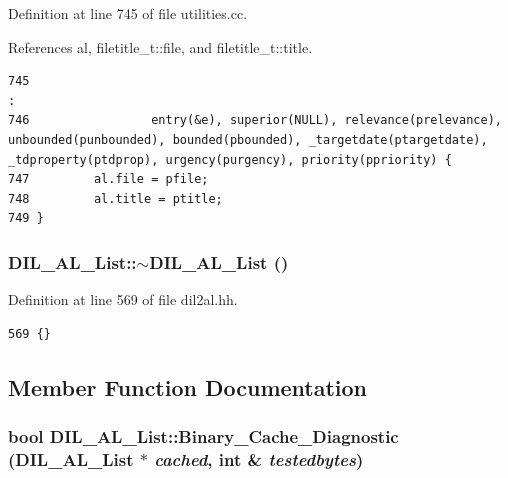 Definition at line 745 of file utilities.cc.

References al, filetitle\_\-t::file, and filetitle\_\-t::title.



\footnotesize\begin{verbatim}745                                                                                                                                                                                         :
746                 entry(&e), superior(NULL), relevance(prelevance), unbounded(punbounded), bounded(pbounded), _targetdate(ptargetdate), _tdproperty(ptdprop), urgency(purgency), priority(ppriority) {
747         al.file = pfile;
748         al.title = ptitle;
749 }

\end{verbatim}\normalsize 
{}
\subsubsection{\setlength{\rightskip}{0pt plus 5cm}DIL\_\-AL\_\-List::$\sim$DIL\_\-AL\_\-List ()\hspace{0.3cm}{\tt  [inline]}}\label{classDIL__AL__List_a2}




Definition at line 569 of file dil2al.hh.



\footnotesize\begin{verbatim}569 {} 
\end{verbatim}\normalsize 


\subsection{Member Function Documentation}
\subsubsection{\setlength{\rightskip}{0pt plus 5cm}bool DIL\_\-AL\_\-List::Binary\_\-Cache\_\-Diagnostic (DIL\_\-AL\_\-List $\ast$ {\em cached}, int \& {\em testedbytes})}\label{classDIL__AL__List_a11}




